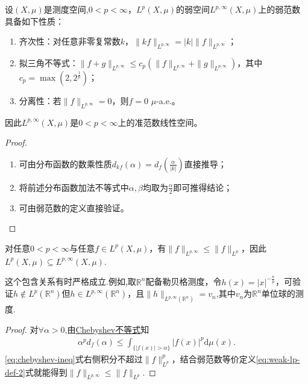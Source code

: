 \documentclass[../../main.tex]{subfiles}%
\begin{document}
\begin{proposition}
设$(X,\mu)$是测度空间,$0<p<\infty$，$L^{p}(X,\mu)$的弱空间$L^{p,\infty}(X,\mu)$上的弱范数具备如下性质：
\begin{enumerate}[(1)]
\item 齐次性：对任意非零复常数$k$，$\|kf\|_{L^{p,\infty}}=|k|\|f\|_{L^{p,\infty}}$；
\item 拟三角不等式：$\|f+g\|_{L^{p,\infty}}\leqslant c_p\left(\|f\|_{L^{p,\infty}}+\|g\|_{L^{p,\infty}}\right)$，其中$c_p=\max\left(2,2^{\frac{1}{p}}\right)$；
\item 分离性：若$\|f\|_{L^{p,\infty}}=0$，则$f=0$ $\mu$-a.e.。
\end{enumerate}
因此$L^{p,\infty}(X,\mu)$是$0<p<\infty$上的准范数线性空间。
\end{proposition}
\begin{proof}
\begin{enumerate}[(1)]
\item 可由分布函数的数乘性质$d_{kf}(\alpha)=d_f\left(\frac{\alpha}{|k|}\right)$直接推导；
\item 将前述分布函数加法不等式中$\alpha,\beta$均取为$\frac{\alpha}{2}$即可推得结论；
\item 可由弱范数的定义直接验证。
\end{enumerate}
\end{proof}

\begin{proposition}\label{proposition:Lp收敛必弱收敛}
对任意$0<p<\infty$与任意$f\in L^p(X,\mu)$，有$\|f\|_{L^{p,\infty}}\leqslant\|f\|_{L^p}$，因此$L^p(X,\mu)\subseteq L^{p,\infty}(X,\mu)$.
\end{proposition}
\begin{remark}
这个包含关系有时严格成立.例如,取$\mathbb{R}^n$配备勒贝格测度，令$h(x)=|x|^{-\frac{n}{p}}$，可验证$h\notin L^p(\mathbb{R}^n)$但$h\in L^{p,\infty}(\mathbb{R}^n)$，且$\|h\|_{L^{p,\infty}(\mathbb{R}^n)}=v_n$,其中$v_n$为$\mathbb{R}^n$单位球的测度.
\end{remark}
\begin{proof}
对$\forall \alpha>0$,由\hyperref[Real Analysis-theorem:实分析-Chebyshev不等式]{Chebyshev不等式}知
\begin{align}
\alpha^p d_f(\alpha)\leqslant \int_{\{|f(x)|>\alpha\}}|f(x)|^p\mathrm{d}\mu(x).
\label{eq:chebyshev-ineq}
\end{align}
\eqref{eq:chebyshev-ineq}式右侧积分不超过$\|f\|_{L^p}^p$，结合弱范数等价定义\eqref{eq:weak-lp-def-2}式就能得到$\|f\|_{L^{p,\infty}}\leqslant\|f\|_{L^p}$.
\end{proof}
\end{document}
